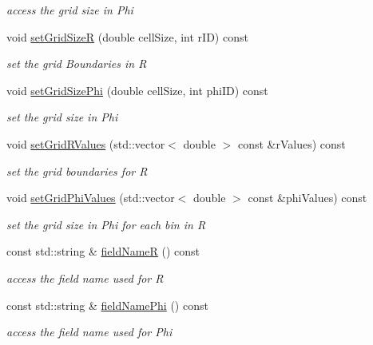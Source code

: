\begin{DoxyCompactItemize}
\begin{DoxyCompactList}\small\item\em access the grid size in Phi \end{DoxyCompactList}\item 
void \hyperlink{class_d_d4hep_1_1_geometry_1_1_polar_grid_r_phi2_ac087d10bd2d8bae47635cce8d8412211}{set\+Grid\+SizeR} (double cell\+Size, int r\+ID) const
\begin{DoxyCompactList}\small\item\em set the grid Boundaries in R \end{DoxyCompactList}\item 
void \hyperlink{class_d_d4hep_1_1_geometry_1_1_polar_grid_r_phi2_a217cad9744079f44c27ecceaf17cfd4d}{set\+Grid\+Size\+Phi} (double cell\+Size, int phi\+ID) const
\begin{DoxyCompactList}\small\item\em set the grid size in Phi \end{DoxyCompactList}\item 
void \hyperlink{class_d_d4hep_1_1_geometry_1_1_polar_grid_r_phi2_aa494a9648325629341dbcdcd91e43128}{set\+Grid\+R\+Values} (std\+::vector$<$ double $>$ const \&r\+Values) const
\begin{DoxyCompactList}\small\item\em set the grid boundaries for R \end{DoxyCompactList}\item 
void \hyperlink{class_d_d4hep_1_1_geometry_1_1_polar_grid_r_phi2_ab274570fed43d73ac9691cb22df0a2b8}{set\+Grid\+Phi\+Values} (std\+::vector$<$ double $>$ const \&phi\+Values) const
\begin{DoxyCompactList}\small\item\em set the grid size in Phi for each bin in R \end{DoxyCompactList}\item 
const std\+::string \& \hyperlink{class_d_d4hep_1_1_geometry_1_1_polar_grid_r_phi2_ab19b5dc8f9b39f3fadbfc1cfec40fa28}{field\+NameR} () const
\begin{DoxyCompactList}\small\item\em access the field name used for R \end{DoxyCompactList}\item 
const std\+::string \& \hyperlink{class_d_d4hep_1_1_geometry_1_1_polar_grid_r_phi2_a43f81a04d3efecec514a5aae99515bf5}{field\+Name\+Phi} () const
\begin{DoxyCompactList}\small\item\em access the field name used for Phi \end{DoxyCompactList}\item 

\end{DoxyCompactItemize}
